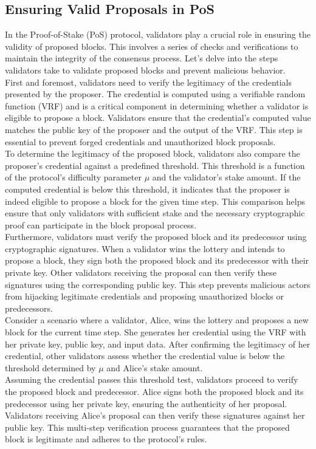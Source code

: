 \subsection{Ensuring Valid Proposals in PoS}
In the Proof-of-Stake (PoS) protocol, validators play a crucial role in ensuring the validity of proposed blocks. This involves a series of checks and verifications to maintain the integrity of the consensus process. Let's delve into the steps validators take to validate proposed blocks and prevent malicious behavior.\\
First and foremost, validators need to verify the legitimacy of the credentials presented by the proposer. The credential is computed using a verifiable random function (VRF) and is a critical component in determining whether a validator is eligible to propose a block. Validators ensure that the credential's computed value matches the public key of the proposer and the output of the VRF. This step is essential to prevent forged credentials and unauthorized block proposals.\\
To determine the legitimacy of the proposed block, validators also compare the proposer's credential against a predefined threshold. This threshold is a function of the protocol's difficulty parameter $\mu$ and the validator's stake amount. If the computed credential is below this threshold, it indicates that the proposer is indeed eligible to propose a block for the given time step. This comparison helps ensure that only validators with sufficient stake and the necessary cryptographic proof can participate in the block proposal process.\\
Furthermore, validators must verify the proposed block and its predecessor using cryptographic signatures. When a validator wins the lottery and intends to propose a block, they sign both the proposed block and its predecessor with their private key. Other validators receiving the proposal can then verify these signatures using the corresponding public key. This step prevents malicious actors from hijacking legitimate credentials and proposing unauthorized blocks or predecessors.\\
Consider a scenario where a validator, Alice, wins the lottery and proposes a new block for the current time step. She generates her credential using the VRF with her private key, public key, and input data. After confirming the legitimacy of her credential, other validators assess whether the credential value is below the threshold determined by $\mu$ and Alice's stake amount.\\
Assuming the credential passes this threshold test, validators proceed to verify the proposed block and predecessor. Alice signs both the proposed block and its predecessor using her private key, ensuring the authenticity of her proposal. Validators receiving Alice's proposal can then verify these signatures against her public key. This multi-step verification process guarantees that the proposed block is legitimate and adheres to the protocol's rules.

